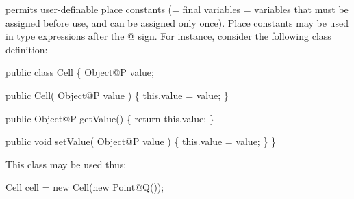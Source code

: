 \Xten{} permits user-definable place constants (= final variables =
variables that must be assigned before use, and can be assigned only
once). Place constants may be used in type expressions after the {\cf @}
sign. For instance, consider the following class definition:

\begin{x10}
 public class Cell \{
  Object@P value;

  public Cell( Object@P value ) \{  
     this.value = value;
  \}

  public Object@P getValue() \{
     return this.value;
  \}

  public void setValue( Object@P value ) \{
     this.value = value;
  \}
 \}
\end{x10}

This class may be used thus:

\begin{x10}
Cell cell = 
   new Cell(new Point@Q());
\end{x10}


